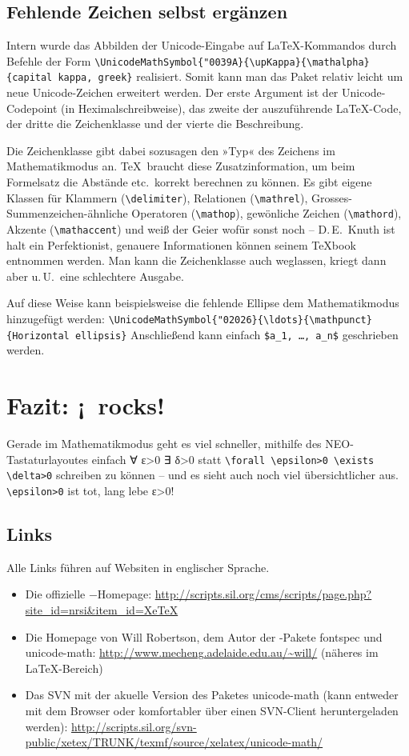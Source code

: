 ﻿\documentclass{scrartcl}
\begin{document}
\subsection{Fehlende Zeichen selbst ergänzen}
Intern wurde das Abbilden der Unicode-Eingabe auf \LaTeX-Kommandos durch Befehle der Form
\verb|\UnicodeMathSymbol{"0039A}{\upKappa}{\mathalpha}{capital kappa, greek}|
realisiert. Somit kann man das Paket relativ leicht um neue Unicode-Zeichen erweitert werden. Der erste Argument ist der Unicode-Codepoint (in Heximalschreibweise), das zweite der auszuführende \LaTeX-Code, der dritte die Zeichenklasse und der vierte die Beschreibung.

Die Zeichenklasse gibt dabei sozusagen den »Typ« des Zeichens im Mathematikmodus an. \TeX\ braucht diese Zusatzinformation, um beim Formelsatz die Abstände etc.\ korrekt berechnen zu können. Es gibt eigene Klassen für Klammern (\verb|\delimiter|), Relationen (\verb|\mathrel|), Grosses-Summenzeichen-ähnliche Operatoren (\verb|\mathop|), gewönliche Zeichen (\verb|\mathord|), Akzente (\verb|\mathaccent|) und weiß der Geier wofür sonst noch – D.\,E.~Knuth ist halt ein Perfektionist, genauere Informationen können seinem \TeX book entnommen werden. Man kann die Zeichenklasse auch weglassen, kriegt dann aber u.\,U.\ eine schlechtere Ausgabe.

Auf diese Weise kann beispielsweise die fehlende Ellipse dem Mathematikmodus hinzugefügt werden: \verb|\UnicodeMathSymbol{"02026}{\ldots}{\mathpunct}{Horizontal ellipsis}|
Anschließend kann einfach \verb|$a_1, …, a_n$| geschrieben werden.

\section*{Fazit: ¡\XeTeX\ rocks!}
Gerade im Mathematikmodus geht es viel schneller, mithilfe des NEO-Tastaturlayoutes einfach ∀ ε>0 ∃ δ>0 statt \verb|\forall \epsilon>0 \exists \delta>0| schreiben zu können – und es sieht auch noch viel übersichtlicher aus. \verb|\epsilon>0| ist tot, lang lebe ε>0!

\subsection*{Links}
Alle Links führen auf Websiten in englischer Sprache.
\begin{itemize}
\item Die offizielle \XeTeX−Homepage: \url{http://scripts.sil.org/cms/scripts/page.php?site_id=nrsi&item_id=XeTeX}
\item Die Homepage von Will Robertson, dem Autor der \XeTeX-Pakete fontspec und unicode-math: \url{http://www.mecheng.adelaide.edu.au/~will/}  (näheres im \LaTeX-Bereich)
\item Das SVN mit der akuelle Version des Paketes unicode-math (kann entweder mit dem Browser oder komfortabler über einen SVN-Client heruntergeladen werden): \url{http://scripts.sil.org/svn-public/xetex/TRUNK/texmf/source/xelatex/unicode-math/}
\end{itemize}
\end{document}
